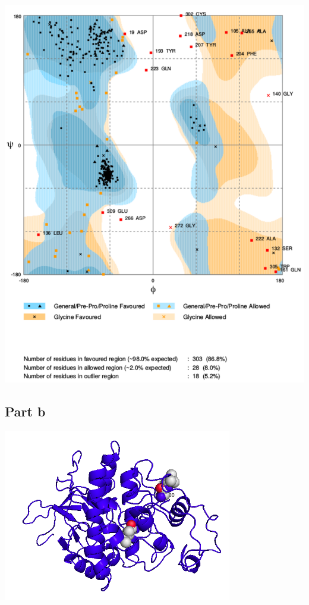 \documentclass[11pt, a4paper,titlepage]{article}
\begin{document}
\includegraphics[width=16cm]{./Figures/7a-ramachandran.pdf}
\subsection*{Part b}

\includegraphics[width=10cm]{./Figures/7b.png}
\end{document}
